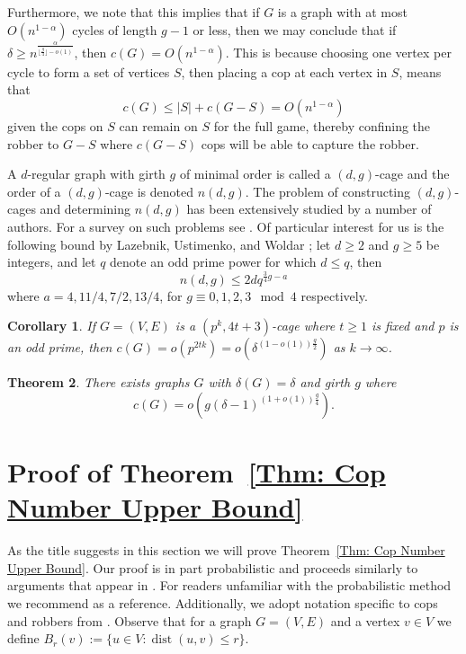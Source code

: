 \documentclass{amsart}
\DeclareMathOperator{\dist}{dist}
\newtheorem{theorem}{Theorem}[section]
\newtheorem{corollary}[theorem]{Corollary}
\theoremstyle{definition}
\begin{document}
Furthermore, we note that this implies that if $G$ is a graph with at most $O(n^{1-\alpha})$ cycles of length $g-1$ or less, then we may conclude that if $\delta \geq n^{\frac{\alpha}{ \lfloor \frac{g}{4} \rfloor-o(1)}}$, then $c(G) = O(n^{1-\alpha})$. This is because choosing one vertex per cycle to form a set of vertices $S$, then placing a cop at each vertex in $S$, means that 
\[
c(G) \leq |S|+c(G-S) = O(n^{1-\alpha})
\]
given the cops on $S$ can remain on $S$ for the full game, thereby confining the robber to $G-S$ where $c(G-S)$ cops will be able to capture the robber.


A $d$-regular graph with girth $g$ of minimal order is called a $(d,g)$-cage and the order of a $(d,g)$-cage is denoted $n(d,g)$. The problem of constructing $(d,g)$-cages and determining $n(d,g)$ has been extensively studied by a number of authors. For a survey on such problems see \cite{exoo2012dynamic}. Of particular interest for us is the following bound by Lazebnik, Ustimenko, and Woldar \cite{lazebnik1997upper}; let $d \geq 2$ and $g \geq 5$ be integers, and let $q$ denote an odd prime power for which $d \leq q$, then 
\[
n(d,g) \leq 2dq^{\frac{3}{4}g-a}
\]
where $a = 4,11/\! 4, 7/\! 2, 13/\! 4$, for $g \equiv 0,1,2,3 \mod{4}$ respectively.


\begin{corollary}\label{Corollary: Cop Number of Specific Cages}
If $G = (V,E)$ is a $(p^k,4t+3)$-cage where $t\geq 1$ is fixed and $p$ is an odd prime, then $c(G) = o(p^{2tk}) = o(\delta^{(1-o(1))\frac{g}{2}})$ as $k \rightarrow \infty$.
\end{corollary}




\begin{theorem}\label{Thm: Large Girth Small Cop Number}
There exists graphs $G$ with $\delta(G) = \delta$ and girth $g$ where 
\[
c(G) = o(g (\delta-1)^{(1+o(1))\frac{g}{4}}).
\]
\end{theorem}







\vspace{0.5cm}
\section{Proof of Theorem~\ref{Thm: Cop Number Upper Bound}}

As the title suggests in this section we will prove Theorem~\ref{Thm: Cop Number Upper Bound}. Our proof is in part probabilistic and proceeds similarly to arguments that appear in \cite{lu2012meyniel, scott2011bound, bradshaw2023cop}. For readers unfamiliar with the probabilistic method  we recommend \cite{alon2016probabilistic} as a reference. Additionally, we adopt notation specific to cops and robbers from \cite{bonato2011game}. Observe that for a graph $G=(V,E)$ and a vertex $v\in V$ we define $B_r(v) := \{u \in V: \dist(u,v) \leq r\}$.
\end{document}
